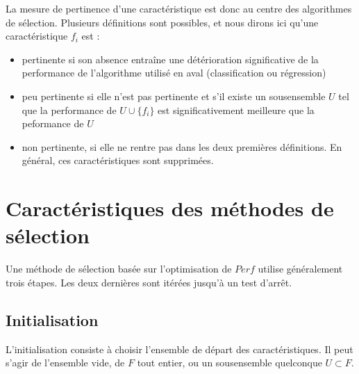 \documentclass[letterpaper,10pt,french]{sphinxmanual}
\begin{document}
\sphinxAtStartPar
La mesure de pertinence d’une caractéristique est donc au centre des algorithmes de sélection. Plusieurs définitions sont possibles, et nous dirons ici  qu’une caractéristique \(f_i\) est :
\begin{itemize}
\item {} 
\sphinxAtStartPar
pertinente si son absence entraîne une détérioration significative de la performance de l’algorithme utilisé en aval (classification ou régression)

\item {} 
\sphinxAtStartPar
peu pertinente si elle n’est pas pertinente et s’il existe un sous\sphinxhyphen{}ensemble \(U\) tel que la performance de \(U\cup\{f_i\}\) est significativement meilleure que la peformance de \(U\)

\item {} 
\sphinxAtStartPar
non pertinente, si elle ne rentre pas dans les deux premières définitions. En général, ces caractéristiques sont supprimées.

\end{itemize}


\section{Caractéristiques des méthodes de sélection}
\label{\detokenize{selection:caracteristiques-des-methodes-de-selection}}
\sphinxAtStartPar
Une méthode de sélection basée sur l’optimisation de \(Perf\) utilise généralement trois étapes. Les  deux dernières sont itérées jusqu’à un test d’arrêt.


\subsection{Initialisation}
\label{\detokenize{selection:initialisation}}
\sphinxAtStartPar
L’initialisation consiste à choisir l’ensemble de départ des caractéristiques. Il peut s’agir de l’ensemble vide, de \(F\) tout entier, ou un sous\sphinxhyphen{}ensemble quelconque \(U\subset F\).
\end{document}
